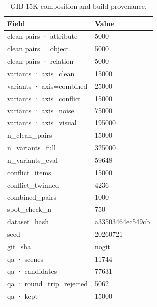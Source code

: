 \begin{table}[t]
\centering
\small
\begin{tabular}{ll}
\toprule
Field & Value \\
\midrule
clean pairs · attribute & 5000 \\
clean pairs · object & 5000 \\
clean pairs · relation & 5000 \\
variants · axis=clean & 15000 \\
variants · axis=combined & 25000 \\
variants · axis=conflict & 15000 \\
variants · axis=noise & 75000 \\
variants · axis=visual & 195000 \\
n\_clean\_pairs & 15000 \\
n\_variants\_full & 325000 \\
n\_variants\_eval & 59648 \\
conflict\_items & 15000 \\
conflict\_twinned & 4236 \\
combined\_pairs & 1000 \\
spot\_check\_n & 750 \\
dataset\_hash & a33503464ec549cb \\
seed & 20260721 \\
git\_sha & nogit \\
qa · scenes & 11744 \\
qa · candidates & 77631 \\
qa · round\_trip\_rejected & 5062 \\
qa · kept & 15000 \\
\bottomrule
\end{tabular}
\caption{GIB-15K composition and build provenance.}
\end{table}
